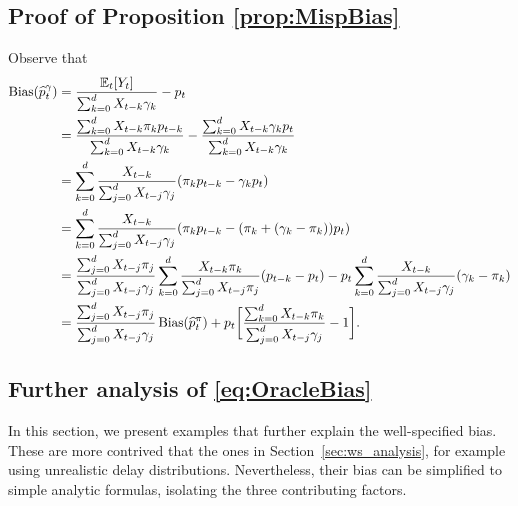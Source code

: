 \documentclass{article}
\renewcommand{\hat}{\widehat} %
\DeclareMathOperator{\bias}{Bias}
\begin{document}

\subsection{Proof of Proposition \ref{prop:MispBias}}
\label{apx:MispBias}

Observe that
\begin{align*}
\bias(\hat{p}_t^\gamma) 
&= \frac{\E_t[Y_t]}{\sum_{k=0}^d X_{t-k}\gamma_k} - p_t \\
&= \frac{\sum_{k=0}^d X_{t-k}\pi_k p_{t-k}}{\sum_{k=0}^d X_{t-k}\gamma_k} -
\frac{\sum_{k=0}^d X_{t-k}\gamma_k p_t}{\sum_{k=0}^d X_{t-k}\gamma_k} \\
&= \sum_{k=0}^d \frac{X_{t-k}}{\sum_{j=0}^d X_{t-j}\gamma_j}
(\pi_k p_{t-k} - \gamma_k p_t) \\
&= \sum_{k=0}^d \frac{X_{t-k}}{\sum_{j=0}^d X_{t-j}\gamma_j}
(\pi_k p_{t-k}-(\pi_k +(\gamma_k-\pi_k)) p_t) \\
&= \frac{\sum_{j=0}^d X_{t-j}\pi_j}{\sum_{j=0}^d X_{t-j}\gamma_j}
\sum_{k=0}^d \frac{X_{t-k}\pi_k}{\sum_{j=0}^d X_{t-j}\pi_j}(p_{t-k}-p_t) -
p_t\sum_{k=0}^d \frac{X_{t-k}}{\sum_{j=0}^d X_{t-j}\gamma_j}(\gamma_k -\pi_k) \\ 
&= \frac{\sum_{j=0}^d X_{t-j}\pi_j}{\sum_{j=0}^d X_{t-j}\gamma_j} 
\bias(\hat{p}_t^\pi) + p_t\bigg[ \frac{\sum_{k=0}^d X_{t-k}\pi_k} 
{\sum_{j=0}^d X_{t-j}\gamma_j}-1\bigg].
\end{align*}

\subsection{Further analysis of \eqref{eq:OracleBias}}
\label{apx:analysis}

In this section, we present examples that further explain the well-specified bias. These are more contrived that the ones in Section~\ref{sec:ws_analysis}, for example using unrealistic delay distributions. Nevertheless, their bias can be simplified to simple analytic formulas, isolating the three contributing factors.
\end{document}
